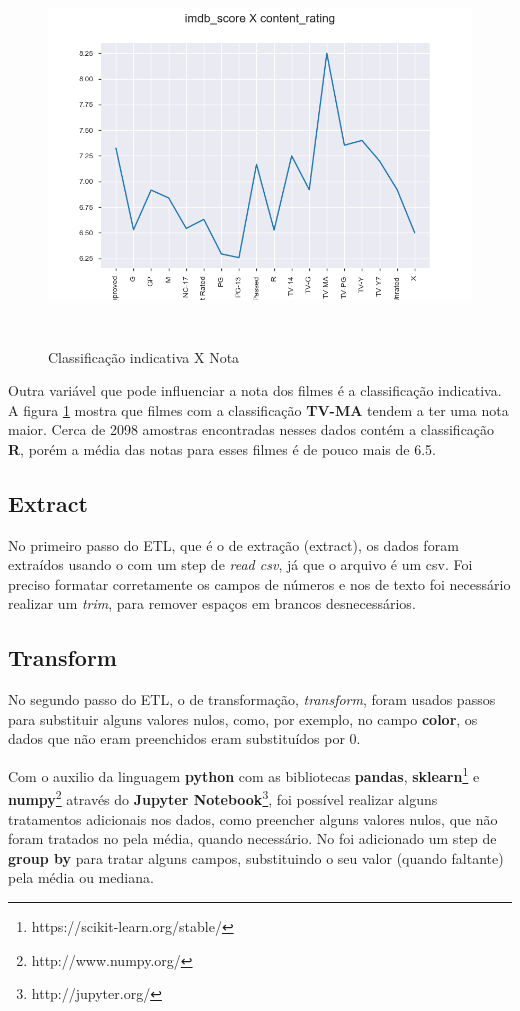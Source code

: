 \begin{figure}[H]
\centering
\includegraphics[height=10cm]{imagens/scoreXcontent.png}
\caption{Classificação indicativa X Nota}
\label{ratingXscore}
\end{figure}
Outra variável que pode influenciar a nota dos filmes é a classificação indicativa. A figura \ref{ratingXscore} mostra que filmes com a classificação \textbf{TV-MA} tendem a ter uma nota maior. Cerca de 2098 amostras encontradas nesses dados contém a classificação \textbf{R}, porém a média das notas para esses filmes é de pouco mais de 6.5.

\subsection{Extract}
No primeiro passo do ETL, que é o de extração (extract), os dados foram extraídos usando o \pdi com um step de \textit{read csv}, já que o arquivo é um csv. Foi preciso formatar corretamente os campos de números e nos de texto foi necessário realizar um \textit{trim}, para remover espaços em brancos desnecessários. 

\subsection{Transform}
No segundo passo do ETL, o de transformação, \textit{transform}, foram usados passos para substituir alguns valores nulos, como, por exemplo, no campo \textbf{color}, os dados que não eram preenchidos eram substituídos por 0. 

Com o auxilio da linguagem \textbf{python} com as bibliotecas \textbf{pandas}, \textbf{sklearn}\footnote{https://scikit-learn.org/stable/} e \textbf{numpy}\footnote{http://www.numpy.org/} através do \textbf{Jupyter Notebook}\footnote{http://jupyter.org/}, foi possível realizar alguns tratamentos adicionais nos dados, como preencher alguns valores nulos, que não foram tratados no \pdi pela média, quando necessário. No \pdi foi adicionado um step de \textbf{group by} para tratar alguns campos, substituindo o seu valor (quando faltante) pela média ou mediana. 


